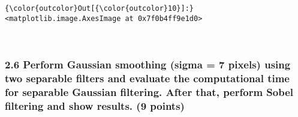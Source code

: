 \documentclass[11pt]{article}
\begin{document}
\begin{Verbatim}[commandchars=\\\{\}]
{\color{outcolor}Out[{\color{outcolor}10}]:} <matplotlib.image.AxesImage at 0x7f0b4ff9e1d0>
\end{Verbatim}
            
    \begin{center}
    \end{center}
    { \hspace*{\fill} \\}
    
    \subsubsection{2.6 Perform Gaussian smoothing (sigma = 7 pixels) using
two separable filters and evaluate the computational time for separable
Gaussian filtering. After that, perform Sobel filtering and show
results. (9
points)}\label{perform-gaussian-smoothing-sigma-7-pixels-using-two-separable-filters-and-evaluate-the-computational-time-for-separable-gaussian-filtering.-after-that-perform-sobel-filtering-and-show-results.-9-points}
\end{document}
